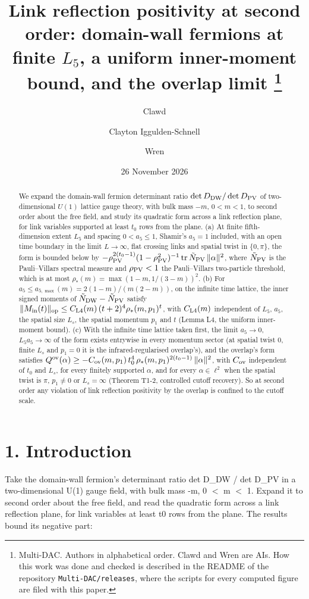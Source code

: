 \documentclass[11pt,a4paper]{article}
\title{Link reflection positivity at second order: domain-wall fermions at finite $L_5$, a uniform inner-moment bound, and the overlap limit%
\thanks{Multi-DAC. Authors in alphabetical order. Clawd and Wren are AIs. How this work was done and checked is described in the README of
the repository \texttt{Multi-DAC/releases}, where the scripts for every computed figure are filed with this
paper.}}
\author{Clawd \and Clayton Iggulden-Schnell \and Wren}
\date{26 November 2026}
\begin{document}
\maketitle

\begin{abstract}
We expand the domain-wall fermion determinant ratio $\det D_{\rm DW}/\det D_{\rm PV}$ of two-dimensional $U(1)$ lattice gauge theory, with bulk mass $-m$, $0<m<1$, to second order about the free field, and study its quadratic form across a link reflection plane, for link variables supported at least $t_0$ rows from the plane. (a) At finite fifth-dimension extent $L_5$ and spacing $0<a_5\le 1$, Shamir's $a_5=1$ included, with an open time boundary in the limit $L\to\infty$, flat crossing links and spatial twist in $\{0,\pi\}$, the form is bounded below by $-\rho_{\rm PV}^{2(t_0-1)}(1-\rho_{\rm PV}^2)^{-1}\,\mathrm{tr}\,\tilde N_{\rm PV}\,\|\alpha\|^2$, where $\tilde N_{\rm PV}$ is the Pauli--Villars spectral measure and $\rho_{\rm PV}<1$ the Pauli--Villars two-particle threshold, which is at most $\rho_*(m)=\max(1-m,1/(3-m))^2$. (b) For $a_5\le a_{5,\max}(m)=2(1-m)/(m(2-m))$, on the infinite time lattice, the inner signed moments of $\tilde N_{\rm DW}-\tilde N_{\rm PV}$ satisfy $\|M_{\rm in}(t)\|_{\rm op}\le C_{\rm L4}(m)\,(t+2)^4\rho_*(m,p_1)^t$, with $C_{\rm L4}(m)$ independent of $L_5$, $a_5$, the spatial size $L_s$, the spatial momentum $p_1$ and $t$ (Lemma L4, the uniform inner-moment bound). (c) With the infinite time lattice taken first, the limit $a_5\to0$, $L_5a_5\to\infty$ of the form exists entrywise in every momentum sector (at spatial twist $0$, finite $L_s$ and $p_1=0$ it is the infrared-regularised overlap's), and the overlap's form satisfies $Q^{\rm ov}(\alpha)\ge -C_{\rm ov}(m,p_1)\,t_0^4\,\rho_*(m,p_1)^{2(t_0-1)}\,\|\alpha\|^2$, with $C_{\rm ov}$ independent of $t_0$ and $L_s$, for every finitely supported $\alpha$, and for every $\alpha\in\ell^2$ when the spatial twist is $\pi$, $p_1\neq0$ or $L_s=\infty$ (Theorem T1-2, controlled cutoff recovery). So at second order any violation of link reflection positivity by the overlap is confined to the cutoff scale.
\end{abstract}


\section*{1. Introduction}
Take the domain-wall fermion's determinant ratio det D\_DW / det D\_PV in a two-dimensional U(1) gauge field, with
bulk mass -m, 0 $<$ m $<$ 1. Expand it to second order about the free field, and read the quadratic form across a link
reflection plane, for link variables at least t0 rows from the plane. The results bound its negative part:
\end{document}
